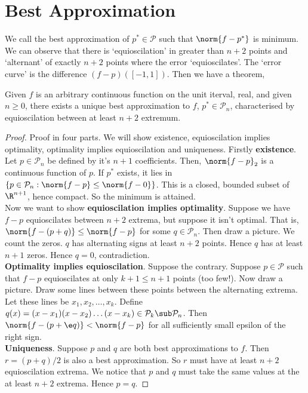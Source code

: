 
\section{Best Approximation}
We call the best approximation of $p^* \in \mathcal{P}$ such that $\norm{f - p^*}$ is minimum. We can observe that there is `equioscilation' in greater than $n+2$ points and `alternant' of exactly $n+2$ points where the error `equioscilates'. The `error curve' is the difference $(f-p)([-1, 1])$. Then we have a theorem,
\begin{nthm}[(1902. Kirchberger)]
  Given $f$ is an arbitrary continuous function on the unit iterval, real, and given $n \ge 0$, there exists a unique best approximation to $f$, $p^* \in \mathcal{P}_n$, characterised by equioscilation between at least $n+2$ extremum.
\end{nthm}
\begin{proof}
  Proof in four parts. We will show existence, equioscilation implies optimality, optimality implies equioscilation and uniqueness. Firstly \textbf{existence}. Let $p \in \mathcal{P}_n$ be defined by it's $n+1$ coefficients. Then, $\norm{f - p}_2$ is a continuous function of $p$. If $p^*$ exists, it lies in $\{p \in \mathcal{P}_n : \norm{f - p} \le \norm{f - 0}\}$. This is a closed, bounded subset of $\R^{n+1}$, hence compact. So the minimum is attained.\\

  \noindent
  Now we want to show \textbf{equioscilation implies optimality}. Suppose we have $f - p$ equioscilates between $n+2$ extrema, but suppose it isn't optimal. That is, $ \norm{f - (p+q)} \le \norm{f - p} $ for some $q \in \mathcal{P}_n$. Then draw a picture. We count the zeros. $q$ has alternating signs at least $n+2$ points. Hence $q$ has at least $n+1$ zeros. Hence $q = 0$, contradiction.\\

  \noindent
  \textbf{Optimality implies equioscilation}. Suppose the contrary. Suppose $p \in \mathcal{P}$ such that $f - p$ equioscilates at only $k+1 \le n+1$ points (too few!). Now draw a picture. Draw some lines between these points between the alternating extrema. Let these lines be $x_1, x_2, \dots, x_k$. Define $q(x) = (x-x_1)(x -x_2)\dots (x-x_k) \in \mathcal{P}_k \sub \mathcal{P}_n$. Then $\norm{f - (p + \e q)} < \norm{f-p}$ for all sufficiently small epsilon of the right sign.\\

  \noindent
  \textbf{Uniqueness}. Suppose $p$ and $q$ are both best approximations to $f$. Then $r = (p+q)/2$ is also a best approximation. So $r$ must have at least $n+2$ equioscilation extrema. We notice that $p$ and $q$ must take the same values at the at least $n+2$ extrema. Hence $p = q$.
\end{proof}

